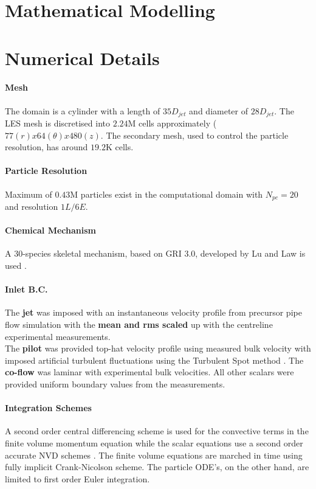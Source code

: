 \section{Mathematical Modelling}
\label{mathModel}

\section{Numerical Details}

\paragraph{Mesh} The domain is a cylinder with a length of $35D_{jet}$ and diameter of $28D_{jet}$. The LES mesh is discretised into $2.24$M cells approximately ($77(r)x64(\theta)x480(z)$.
The secondary mesh, used to control the particle resolution, has around $19.2$K cells.

\paragraph{Particle Resolution} Maximum of $0.43$M particles exist in  the computational domain with $N_{pc}=20$ and resolution $1L/6E$.

\paragraph{Chemical Mechanism} A $30$-species skeletal mechanism, based on GRI 3.0, developed by Lu and Law is used \cite{Lu2008}.

\paragraph{Inlet B.C.} The \textbf{jet} was imposed with an instantaneous velocity profile from precursor pipe flow simulation with the \textbf{mean and rms scaled} up with the centreline experimental measurements. \\
The \textbf{pilot} was provided top-hat velocity profile using measured bulk velocity with imposed artificial turbulent fluctuations using the Turbulent Spot method \cite{Kroger2018}. The \textbf{co-flow} was laminar with experimental bulk velocities. All other scalars were provided uniform boundary values from the measurements.

\paragraph{Integration Schemes} A second order central differencing scheme is used for the convective terms in the finite volume momentum equation while the scalar equations use a second order accurate NVD schemes \cite{Jasak1996}. The finite volume equations are marched in time using fully implicit Crank-Nicolson scheme. The particle ODE's, on the other hand, are limited to first order Euler integration.

